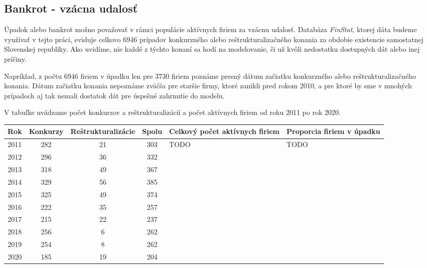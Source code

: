\subsection{Bankrot - vzácna udalosť}

Úpadok alebo bankrot možno považovať v rámci populácie aktívnych firiem za vzácnu udalosť.
Databáza \emph{FinStat}, ktorej dáta budeme využívať v tejto práci, eviduje celkovo 6946 prípadov konkurzného alebo reštrukturalizačného konania za obdobie existencie samostatnej Slovenskej republiky.
Ako uvidíme, nie každé z týchto konaní sa hodí na modelovanie, či už kvôli nedostatku dostupných dát alebo inej príčiny.

Napríklad, z počtu 6946 firiem v úpadku len pre 3730 firiem poznáme presný dátum začiatku konkurzného alebo reštrukturalizačného konania.
Dátum začiatku konania nepoznáme zväčša pre staršie firmy, ktoré zanikli pred rokom 2010, a pre ktoré by sme v mnohých prípadoch aj tak nemali dostatok dát pre úspešné zahrnutie do modelu.

V tabuľke uvádzame počet konkurzov a reštrukturalizácií a počet aktívnych firiem od roku 2011 po rok 2020.

\begin{center}
    \begin{tabular}{ |c|c|c|c|p{3cm}|p{3cm}| }
        \hline
        Rok & Konkurzy & Reštrukturalizácie & Spolu & Celkový počet aktívnych firiem & Proporcia firiem v úpadku \\
        \hline
        2011 & 282 & 21 & 303 & TODO & TODO \\
        \hline
        2012 & 296 & 36 & 332 & & \\
        \hline
        2013 & 318 & 49 & 367 & & \\
        \hline
        2014 & 329 & 56 & 385 & & \\
        \hline
        2015 & 325 & 49 & 374 & & \\
        \hline
        2016 & 222 & 35 & 257 & & \\
        \hline
        2017 & 215 & 22 & 237 & & \\
        \hline
        2018 & 256 & 6 & 262 & & \\
        \hline
        2019 & 254 & 8 & 262 & & \\
        \hline
        2020 & 185 & 19 & 204 & & \\
        \hline
    \end{tabular}
\end{center}
\bigskip

